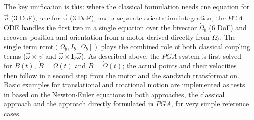 The key unification is this: where the classical formulation needs one equation for
$\dot{\vec{v}}$ (3 DoF), one for $\dot{\vec{\omega}}$ (3 DoF), and a separate orientation
integration, the $PGA$ ODE handles the first two in a single equation over the bivector
$\dot{\Omega}_b$ (6 DoF) and recovers position and orientation from a motor derived
directly from $\Omega_b$. The single term $\mathrm{rcmt}(\Omega_b, I_b[\Omega_b])$ plays
the combined role of both classical coupling terms ($\vec{\omega}\times\vec{v}$ and
$\vec{\omega}\times\mathbf{I}_b\vec{\omega}$). As described above, the $PGA$ system is
first solved for $B(t)$, $\dot{B} = \Omega(t)$ and $\ddot{B} = \dot{\Omega}(t)$; the
actual points and their velocities then follow in a second step from the motor and the
sandwich transformation. \\

Basic examples for translational and rotational motion are implemented as tests in
 based on the Newton-Euler equations in both
approaches, the classical approach and the approach directly formulated in $PGA$, for very
simple reference cases.

